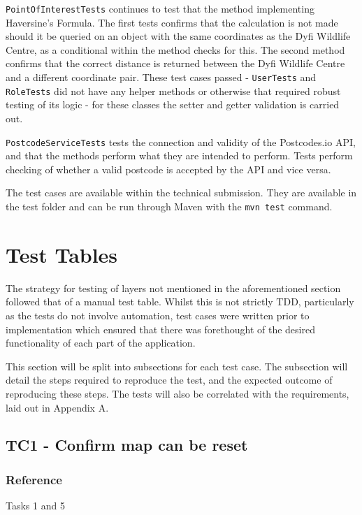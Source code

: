 \texttt{PointOfInterestTests} continues to test that the method implementing Haversine's Formula. The first tests confirms that the calculation is not made should it be queried on an object with the same coordinates as the Dyfi Wildlife Centre, as a conditional within the method checks for this. The second method confirms that the correct distance is returned between the Dyfi Wildlife Centre and a different coordinate pair. These test cases passed - \texttt{UserTests} and \texttt{RoleTests} did not have any helper methods or otherwise that required robust testing of its logic - for these classes the setter and getter validation is carried out.

\texttt{PostcodeServiceTests} tests the connection and validity of the Postcodes.io API, and that the methods perform what they are intended to perform. Tests perform checking of whether a valid postcode is accepted by the API and vice versa. 

The test cases are available within the technical submission. They are available in the test folder and can be run through Maven with the \texttt{mvn test} command.

\section{Test Tables}

The strategy for testing of layers not mentioned in the aforementioned section followed that of a manual test table. Whilst this is not strictly TDD, particularly as the tests do not involve automation, test cases were written prior to implementation which ensured that there was forethought of the desired functionality of each part of the application.

This section will be split into subsections for each test case. The subsection will detail the steps required to reproduce the test, and the expected outcome of reproducing these steps. The tests will also be correlated with the requirements, laid out in Appendix A.

\subsection{TC1 - Confirm map can be reset}

\subsubsection{Reference}

Tasks 1 and 5

